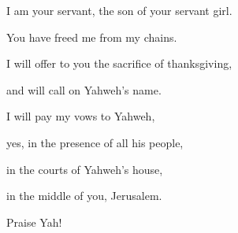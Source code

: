{\par }{\QB I am your servant, the son of your servant girl.
\par }{\QB You have freed me from my chains.
\par }{\Q {}I will offer to you the sacrifice of thanksgiving,
\par }{\QB and will call on Yahweh’s name.
\par }{\Q {}I will pay my vows to Yahweh,
\par }{\QB yes, in the presence of all his people,
\par }{\Q {}in the courts of Yahweh’s house,
\par }{\QB in the middle of you, Jerusalem.
\par }{\Q Praise Yah!

\par }
